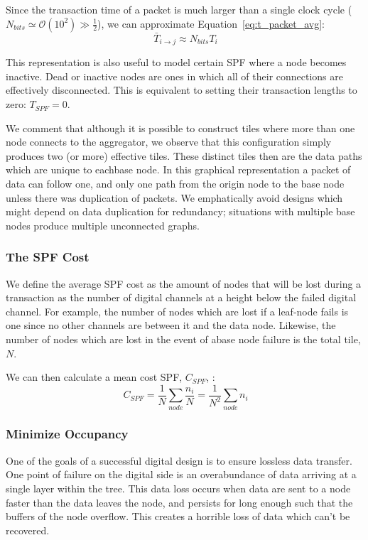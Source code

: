 Since the transaction time of a packet is much larger than a single clock cycle ($N_{bits} \simeq \mathcal{O}(10^{2}) \gg \frac{1}{2}$), we can approximate Equation~\ref{eq:t_packet_avg}:
\begin{equation}~\label{eq:t_packet}
\bar{T}_{i\rightarrow j} \approx N_{bits}T_{i}
\end{equation}

This representation is also useful to model certain SPF where a node becomes inactive.
Dead or inactive nodes are ones in which all of their connections are effectively disconnected.
This is equivalent to setting their transaction lengths to zero: $T_{SPF} = 0$.

We comment that although it is possible to construct tiles where more than one node connects to the aggregator, we observe that this configuration simply produces two (or more) effective tiles.
These distinct tiles then are the data paths which are unique to eachbase node.
In this graphical representation a packet of data can follow one, and only one path from the origin node to the base node unless there was duplication of packets.
We emphatically avoid designs which might depend on data duplication for redundancy; situations with multiple base nodes produce multiple unconnected graphs.

\subsubsection{The SPF Cost}\label{sec:spf_cost}
We define the average SPF cost as the amount of nodes that will be lost during a transaction as the number of digital channels at a height below the failed digital channel.
For example, the number of nodes which are lost if a leaf-node fails is one since no other channels are between it and the data node.
Likewise, the number of nodes which are lost in the event of abase node failure is the total tile, $N$.

We can then calculate a mean cost SPF, $C_{SPF}$, :
\begin{equation}~\label{eq:cspf}
  C_{SPF} = \frac{1}{N}\sum_{node} \frac{n_{i}}{N} = \frac{1}{N^{2}}\sum_{node} n_{i}
\end{equation}

\subsubsection{Minimize Occupancy}\label{sec:min_conn}
One of the goals of a successful digital design is to ensure lossless data transfer.
One point of failure on the digital side is an overabundance of data arriving at a single layer within the tree.
This data loss occurs when data are sent to a node faster than the data leaves the node, and persists for long enough such that the buffers of the node overflow.
This creates a horrible loss of data which can't be recovered.

